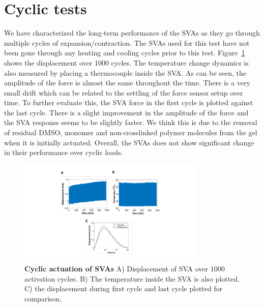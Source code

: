 \section{Cyclic tests}
We have characterized the long-term performance of the SVAs as they go through multiple cycles of expansion/contraction. The SVAs used for this test have not been gone through any heating and cooling cycles prior to this test. Figure~\ref{fig:cyclicDisp} shows the displacement over 1000 cycles. The temperature change dynamics is also measured by placing a thermocouple inside the SVA. As can be seen, the amplitude of the force is almost the same throughout the time. There is a very small drift which can be related to the settling of the force sensor setup over time. To further evaluate this, the SVA force in the first cycle is plotted against the last cycle. There is a slight improvement in the amplitude of the force and the SVA response seems to be slightly faster. We think this is due to the removal of residual DMSO, monomer and non-crosslinked polymer molecules from the gel when it is initially actuated. Overall, the SVAs does not show significant change in their performance over cyclic loads. 
\begin{figure}[!htb]
      \centering
      \includegraphics[width=0.8\textwidth]{cyclicDisp.pdf}
      \caption[Cyclic actuation of SVAs]{\textbf{Cyclic actuation of SVAs} A) Displacement of SVA over 1000 activation cycles. B) The temperature inside the SVA is also plotted. C) the displacement during first cycle and last cycle plotted for comparison.}
      \label{fig:cyclicDisp}
\end{figure}

